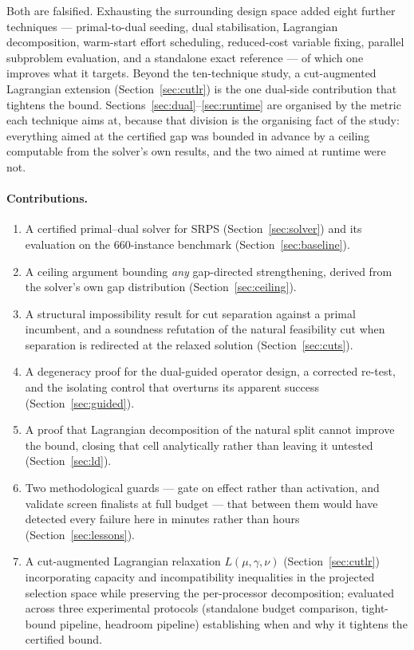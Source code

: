 \documentclass[11pt,a4paper]{article}
\begin{document}
Both are falsified. Exhausting the surrounding design space added eight further
techniques --- primal-to-dual seeding, dual stabilisation, Lagrangian
decomposition, warm-start effort scheduling, reduced-cost variable fixing,
parallel subproblem evaluation, and a standalone exact reference --- of which one
improves what it targets. Beyond the ten-technique study, a cut-augmented
Lagrangian extension (Section~\ref{sec:cutlr}) is the one dual-side contribution
that tightens the bound. Sections~\ref{sec:dual}--\ref{sec:runtime} are organised
by the metric each technique aims at, because that division is the organising fact
of the study: everything aimed at the certified gap was bounded in advance by a
ceiling computable from the solver's own results, and the two aimed at runtime
were not.

\paragraph{Contributions.}
\begin{enumerate}
  \item A certified primal--dual solver for SRPS (Section~\ref{sec:solver}) and
    its evaluation on the 660-instance benchmark (Section~\ref{sec:baseline}).
  \item A ceiling argument bounding \emph{any} gap-directed strengthening, derived
    from the solver's own gap distribution (Section~\ref{sec:ceiling}).
  \item A structural impossibility result for cut separation against a primal
    incumbent, and a soundness refutation of the natural feasibility cut when
    separation is redirected at the relaxed solution (Section~\ref{sec:cuts}).
  \item A degeneracy proof for the dual-guided operator design, a corrected
    re-test, and the isolating control that overturns its apparent success
    (Section~\ref{sec:guided}).
  \item A proof that Lagrangian decomposition of the natural split cannot improve
    the bound, closing that cell analytically rather than leaving it untested
    (Section~\ref{sec:ld}).
  \item Two methodological guards --- gate on effect rather than activation, and
    validate screen finalists at full budget --- that between them would have
    detected every failure here in minutes rather than hours
    (Section~\ref{sec:lessons}).
  \item A cut-augmented Lagrangian relaxation $L(\mu,\gamma,\nu)$
    (Section~\ref{sec:cutlr}) incorporating capacity and incompatibility
    inequalities in the projected selection space while preserving the
    per-processor decomposition; evaluated across three experimental protocols
    (standalone budget comparison, tight-bound pipeline, headroom pipeline)
    establishing when and why it tightens the certified bound.
\end{enumerate}
\end{document}
